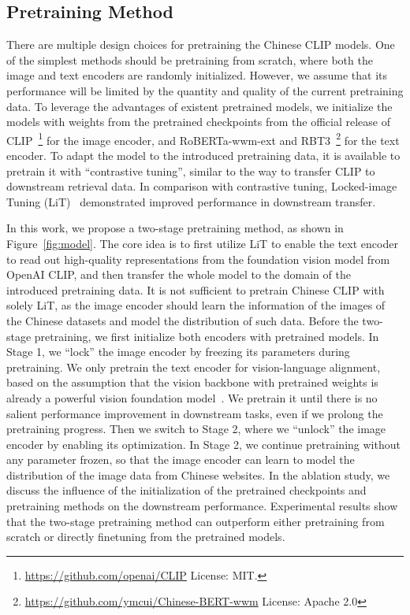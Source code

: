 \documentclass[11pt]{article}
\begin{document}
\subsection{Pretraining Method}
\label{subsec:pretraining_method}

There are multiple design choices for pretraining the Chinese CLIP models. 
One of the simplest methods should be pretraining from scratch, where both the image and text encoders are randomly initialized. 
However, we assume that its performance will be limited by the quantity and quality of the current pretraining data. 
To leverage the advantages of existent pretrained models, we initialize the models with weights from the pretrained checkpoints from the official release of CLIP~\footnote{\url{https://github.com/openai/CLIP} License: MIT.} for the image encoder, and RoBERTa-wwm-ext and RBT3~\footnote{\url{https://github.com/ymcui/Chinese-BERT-wwm} License: Apache 2.0} for the text encoder. 
To adapt the model to the introduced pretraining data, it is available to pretrain it with ``contrastive tuning'', similar to the way to transfer CLIP to downstream retrieval data. 
In comparison with contrastive tuning, Locked-image Tuning (LiT)~\citep{lit} demonstrated improved performance in downstream transfer. 

In this work, we propose a two-stage pretraining method, as shown in Figure~\ref{fig:model}. 
The core idea is to first utilize LiT to enable the text encoder to read out high-quality representations from the foundation vision model from OpenAI CLIP, and then transfer the whole model to the domain of the introduced pretraining data. 
It is not sufficient to pretrain Chinese CLIP with solely LiT, as the image encoder should learn the information of the images of the Chinese datasets and model the distribution of such data. 
Before the two-stage pretraining, we first initialize both encoders with pretrained models. 
In Stage 1, we ``lock'' the image encoder by freezing its parameters during pretraining. 
We only pretrain the text encoder for vision-language alignment, based on the assumption that the vision backbone with pretrained weights is already a powerful vision foundation model~\citep{lit, wukong}. 
We pretrain it until there is no salient performance improvement in downstream tasks, even if we prolong the pretraining progress. 
Then we switch to Stage 2, where we ``unlock'' the image encoder by enabling its optimization. 
In Stage 2, we continue pretraining without any parameter frozen, so that the image encoder can learn to model the distribution of the image data from Chinese websites. 
In the ablation study, we discuss the influence of the initialization of the pretrained checkpoints and pretraining methods on the downstream performance. 
Experimental results show that the two-stage pretraining method can outperform either pretraining from scratch or directly finetuning from the pretrained models. 
\end{document}

